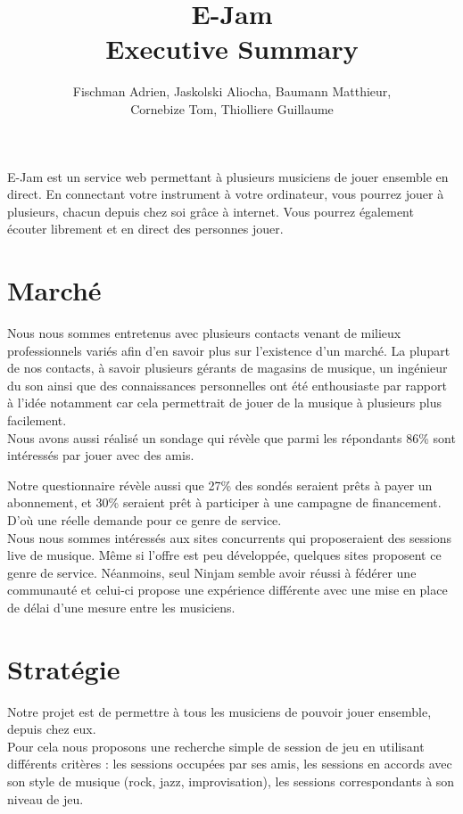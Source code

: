 \documentclass[a4,12pt]{article}
\title{ E-Jam \\ Executive Summary}
\author{Fischman Adrien, Jaskolski Aliocha, Baumann Matthieur,\\ Cornebize Tom, Thiolliere Guillaume}
\date{}
\begin{document}
\maketitle

E-Jam est un service web permettant à plusieurs musiciens de jouer ensemble en direct.
En connectant votre instrument à votre ordinateur, vous pourrez jouer à plusieurs,
chacun depuis chez soi grâce à internet.
Vous pourrez également écouter librement et en direct des personnes jouer.

\section{Marché}

Nous nous sommes entretenus avec plusieurs contacts venant de milieux professionnels
variés afin d’en savoir plus sur l’existence d’un marché.
La plupart de nos contacts, à savoir plusieurs gérants de magasins
de musique, un ingénieur du son ainsi que des connaissances personnelles ont été
enthousiaste par rapport à l'idée notamment car cela permettrait de jouer de la musique
à plusieurs plus facilement.
\\

Nous avons aussi réalisé un sondage qui révèle que parmi les répondants
86\% sont intéressés par jouer avec des amis.

Notre questionnaire révèle aussi que 27\% des sondés seraient prêts à payer un abonnement,
et 30\% seraient prêt à participer à une campagne de financement.
D'où une réelle demande pour ce genre de service.
\\

Nous nous sommes intéressés aux sites concurrents qui proposeraient des sessions
live de musique. Même si l’offre est peu développée, quelques sites proposent ce genre de service.
Néanmoins, seul Ninjam semble avoir réussi à fédérer une communauté et celui-ci propose une expérience
différente avec une mise en place de délai d'une mesure entre les musiciens.
\\

\section{Stratégie}

Notre projet est de permettre à tous les musiciens de pouvoir jouer ensemble,
depuis chez eux.
\\

Pour cela nous proposons une recherche simple de session de jeu en utilisant différents critères :
les sessions occupées par ses amis,
les sessions en accords avec son style de musique (rock, jazz, improvisation),
les sessions correspondants à son niveau de jeu.\\
\end{document}
